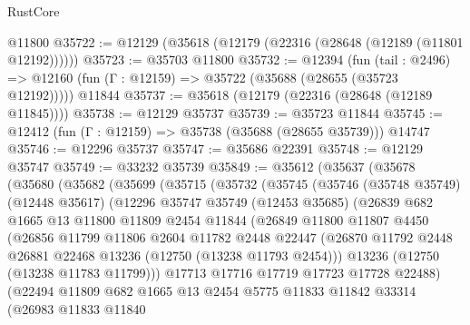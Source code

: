 \begin{lexlean}{RustCore}
\begin{coremodule}
    @11800
@35722 := @12129 (@35618 (@12179 (@22316 (@28648 (@12189 (@11801 @12192))))))
@35723 := @35703 @11800
@35732 := @12394
    (fun (tail : @2496) => @12160 (fun (Γ : @12159) => @35722 (@35688 (@28655 (@35723 @12192)))))
    @11844
@35737 := @35618 (@12179 (@22316 (@28648 (@12189 @11845))))
@35738 := @12129 @35737
@35739 := @35723 @11844
@35745 := @12412 (fun (Γ : @12159) => @35738 (@35688 (@28655 @35739))) @14747
@35746 := @12296 @35737
@35747 := @35686 @22391
@35748 := @12129 @35747
@35749 := @33232 @35739
@35849 := @35612
    (@35637
      (@35678
        (@35680
          (@35682
            (@35699
              (@35715
                (@35732
                  (@35745
                    (@35746
                      (@35748 @35749)
                      (@12448 @35617)
                      (@12296
                        @35747
                        @35749
                        (@12453 @35685)
                        (@26839
                          @682
                          @1665
                          @13
                          @11800
                          @11809
                          @2454
                          @11844
                          (@26849
                            @11800
                            @11807
                            @4450
                            (@26856
                              @11799
                              @11806
                              @2604
                              @11782
                              @2448
                              @22447
                              (@26870
                                @11792
                                @2448
                                @26881
                                @22468
                                @13236
                                (@12750 (@13238 @11793 @2454)))
                              @13236
                              (@12750 (@13238 @11783 @11799)))
                            @17713
                            @17716
                            @17719
                            @17723
                            @17728
                            @22488)
                          (@22494
                            @11809
                            @682
                            @1665
                            @13
                            @2454
                            @5775
                            @11833
                            @11842
                            @33314
                            (@26983
                              @11833
                              @11840

\end{coremodule}
\end{lexlean}
